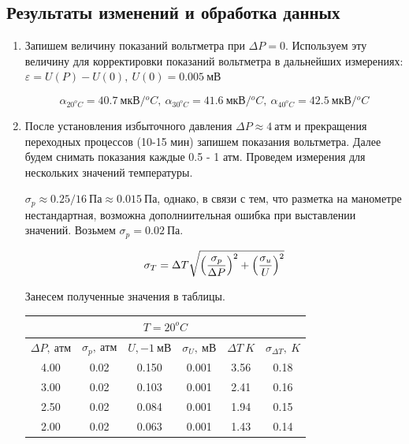 \documentclass[12pt,a4paper]{article}
\begin{document}
\subsection*{Результаты изменений и обработка данных}
\begin{enumerate}
    \item Запишем величину показаний вольтметра при $\Delta P = 0$. 
    Используем эту величину для корректировки показаний вольтметра в дальнейших измерениях: $\varepsilon = U(P) - U(0),\ U(0) = 0.005\ мВ$

    $$\alpha_{20^oC} = 40.7\ мкВ/{^oC},\ \alpha_{30^oC} = 41.6\ мкВ/{^oC},\ \alpha_{40^oC} = 42.5\ мкВ/{^oC}$$
    \item После установления избыточного давления $\Delta P \approx 4\ атм$ и прекращения переходных процессов (10-15 мин) запишем показания вольтметра.
    Далее будем снимать показания каждые 0.5 - 1 атм. Проведем измерения для нескольких значений температуры.
    
    $\sigma_p \approx 0.25/16\ Па \approx 0.015\ Па$, однако, в связи с тем, что разметка на манометре нестандартная, возможна дополниительная ошибка при выставлении значений.
    Возьмем $\sigma_p = 0.02\ Па$.

    \begin{equation*}
        \sigma_T = \Delta T \sqrt{\left({\sigma_p \over \Delta P}\right)^2 + \left({\sigma_u \over U}\right)^2}
    \end{equation*}
    
    Занесем полученные значения в таблицы.
    \begin{table}[htp]
        \centering
        \begin{tabular}[htp]{|c|c|c|c|c|c|}
            \hline
            \multicolumn{6}{|c|}{$T=20^oC$}\\
            \hline
            $\Delta P,\ атм$&$\sigma_p,\ атм$&$U,-1\ мВ$&$\sigma_U,\ мВ$&$\Delta T\ K$&$\sigma_{\Delta T},\ K$\\
            \hline
            4.00&0.02&0.150&0.001&3.56&0.18\\
            \hline
            3.00&0.02&0.103&0.001&2.41&0.16\\
            \hline
            2.50&0.02&0.084&0.001&1.94&0.15\\
            \hline
            2.00&0.02&0.063&0.001&1.43&0.14\\
            \hline
        \end{tabular}
    \end{table}


\end{enumerate}
\end{document}
